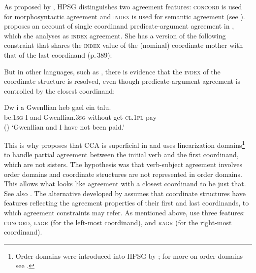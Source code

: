 As proposed by \citet[Chapter~2]{wechsler}, HPSG distinguishes two agreement features: \textsc{concord} is used for
morphosyntactic agreement and \textsc{index} is used for semantic agreement (see
). \citet{Moosally} proposes an account
of single coordinand predicate-argument agreement in , which she analyses as  \textsc{index} agreement. She has  a version of the following 
constraint that shares the \textsc{index} value of the (nominal) coordinate mother with that of the
last coordinand (p.\,389):

\ea
{}
\z


But in other languages, such as , there is evidence that the \textsc{index} of the coordinate
structure is resolved, even though predicate-argument agreement is controlled by the closest coordinand: 

\ea 
\gll Dw              i a   Gwenllian              heb     gael ein                      talu.\footnotemark\\
     be.1\textsc{sg} I and Gwenllian.3\textsc{sg} without get  \textsc{cl}.1\textsc{pl} pay \\\hfill()
\glt  `Gwenllian and I have not been paid.'
\z

\noindent
This is why \citet{Borsley:2009} proposes that CCA is superficial in  and uses
linearization domains\label{page-linearization-domains-in-coordination-one}\footnote{%
  Order domains were introduced into HPSG by \citet{Reape94a}; for more on order domains see
  .
} to handle partial agreement between the initial verb and the first coordinand, which are not sisters.
The hypothesis  was that verb-subject agreement involves order domains and coordinate structures are
not represented in order domains. This allows what looks like agreement with a closest coordinand to
be just that. See also . The alternative developed by \citet{Villavicencio:Sadler:ea:05} assumes that
coordinate structures have features reflecting the agreement properties of their first and last
coordinands, to which agreement constraints may refer. As mentioned above,
\citet{Villavicencio:Sadler:ea:05} use three features: \textsc{concord}, \textsc{lagr} (for the
left-most coordinand), and \textsc{ragr} (for the right-most coordinand). 

